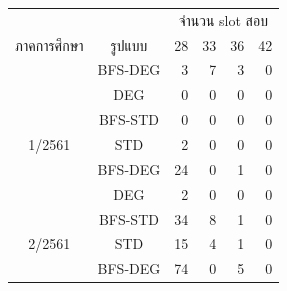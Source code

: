 \begin{table}[]
    \centering
    \begin{tabular}{@{}ccrrrr@{}}
    \toprule
                                  &                            & \multicolumn{4}{c}{จำนวน slot สอบ}                                                                         \\ \cmidrule(l){3-6} 
    \multirow{-2}{*}{ภาคการศึกษา} & \multirow{-2}{*}{รูปแบบ}   & 28                        & 33                       & 36                       & 42                       \\ \midrule
                                  & BFS-DEG                    & 3                         & 7                        & 3                        & 0                        \\ \cmidrule(l){2-6} 
                                  & {\color[HTML]{FE0000} DEG} & {\color[HTML]{FE0000} 0}  & {\color[HTML]{FE0000} 0} & {\color[HTML]{FE0000} 0} & {\color[HTML]{FE0000} 0} \\ \cmidrule(l){2-6} 
                                  & BFS-STD                    & 0                         & 0                        & 0                        & 0                        \\ \cmidrule(l){2-6} 
    \multirow{-4}{*}{1/2561}      & STD                        & 2                         & 0                        & 0                        & 0                        \\ \midrule
                                  & BFS-DEG                    & 24                        & 0                        & 1                        & 0                        \\ \cmidrule(l){2-6} 
                                  & {\color[HTML]{FE0000} DEG} & {\color[HTML]{FE0000} 2}  & {\color[HTML]{FE0000} 0} & {\color[HTML]{FE0000} 0} & {\color[HTML]{FE0000} 0} \\ \cmidrule(l){2-6} 
                                  & BFS-STD                    & 34                        & 8                        & 1                        & 0                        \\ \cmidrule(l){2-6} 
    \multirow{-4}{*}{2/2561}      & STD                        & 15                        & 4                        & 1                        & 0                        \\ \midrule
                                  & BFS-DEG                    & 74                        & 0                        & 5                        & 0                        \\ \cmidrule(l){2-6} 

\end{tabular}
\end{table}
